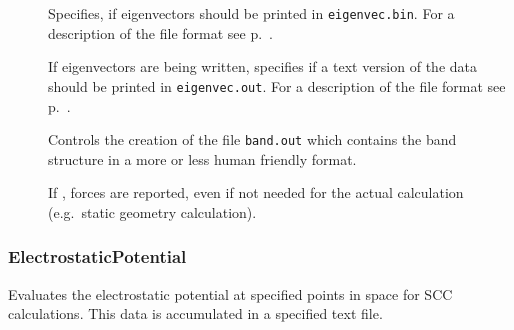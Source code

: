 \begin{description}
\item[] Specifies, if eigenvectors should be printed in
  \verb|eigenvec.bin|. For a description of the file format see
  p.~.

\item[] If eigenvectors are being written, specifies if a
  text version of the data should be printed in \verb|eigenvec.out|. For a
  description of the file format see p.~.

\item[]  Controls the creation of the file \verb|band.out|
  which contains the band structure in a more or less human friendly format.

\item[] If , forces are reported, even if not needed
  for the actual calculation (e.g.\ static geometry calculation).

\end{description}

\subsubsection{ElectrostaticPotential}
\label{sec:dftbp.esp}

Evaluates the electrostatic potential at specified points in space for SCC
calculations. This data is accumulated in a specified text file.

